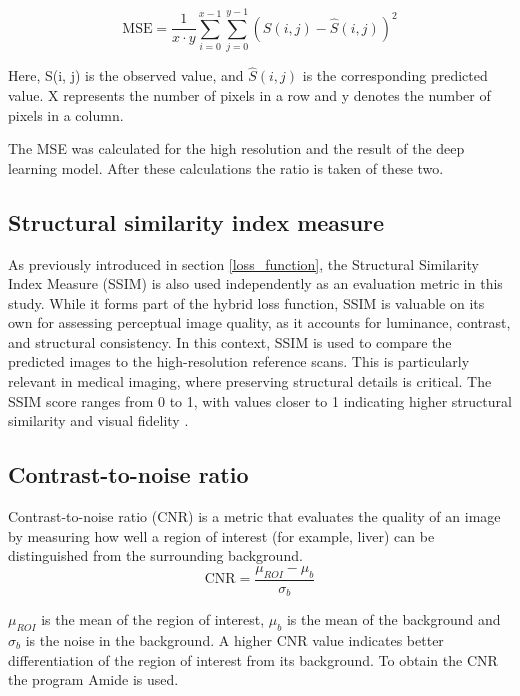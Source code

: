 \documentclass[twocolumn]{article}
\begin{document}
\begin{equation}\label{eq:MSE}
    \text{MSE} = \frac{1}{x \cdot y} \sum_{i=0}^{x-1} \sum_{j=0}^{y-1} \left( S(i, j) - \hat{S}(i, j) \right)^2
\end{equation}

Here, S(i, j) is the observed value, and $\hat{S}(i, j)$  is the corresponding predicted value. 
X represents the number of pixels in a row and y denotes the number of pixels in a column. \cite{mseJim}

The MSE was calculated for the high resolution and the result of the deep learning model. After these calculations the ratio is taken of these two.

\subsection{Structural similarity index measure}\label{Structural similarity index measure}

As previously introduced in section \ref{loss_function}, the Structural Similarity Index Measure (SSIM) is also used independently as an evaluation metric in this study.  
While it forms part of the hybrid loss function, SSIM is valuable on its own for assessing perceptual image quality, as it accounts for luminance, contrast, and structural consistency.
In this context, SSIM is used to compare the predicted images to the high-resolution reference scans.  
This is particularly relevant in medical imaging, where preserving structural details is critical.  
The SSIM score ranges from 0 to 1, with values closer to 1 indicating higher structural similarity and visual fidelity \cite{dosselmann-2009}.

\subsection{Contrast-to-noise ratio}
Contrast-to-noise ratio (CNR) is a metric that evaluates the quality of an image by measuring how well a region of interest (for example, liver) can be distinguished from the surrounding background.
\begin{equation}\label{CNR}
\text{CNR}=\frac{\mu_{ROI}-\mu_b}{\sigma_b}
\end{equation}

$\mu_{ROI}$ is the mean of the region of interest, $\mu_b$ is the mean of the background and $\sigma_b$ is the noise in the background.
A higher CNR value indicates better differentiation of the region of interest from its background.
To obtain the CNR the program Amide is used.
\end{document}
